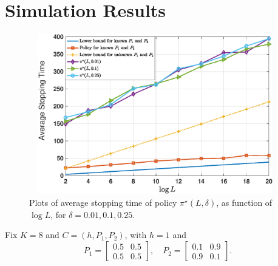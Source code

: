 %
%

\section{Simulation Results}\label{rested_arms_sec:simulation_results}
\begin{figure}
	\begin{center}
		\includegraphics[width=11cm,height=7cm]{images/Plots8ArmsAndLmax20.eps}
	\end{center}
	\caption{Plots of average stopping time of policy $\pi^{\star}(L,\delta)$, as function of $\log L$, for $\delta=0.01,0.1,0.25$.}
	\label{rested_arms_fig:plots}
\end{figure}
Fix $K=8$ and $C=(h,P_1,P_2)$, with $h=1$ and $$ P_1=\begin{bmatrix}
	0.5&0.5\\0.5&0.5
\end{bmatrix},\quad  P_2=\begin{bmatrix}
	0.1&0.9\\0.9&0.1
\end{bmatrix}.$$
